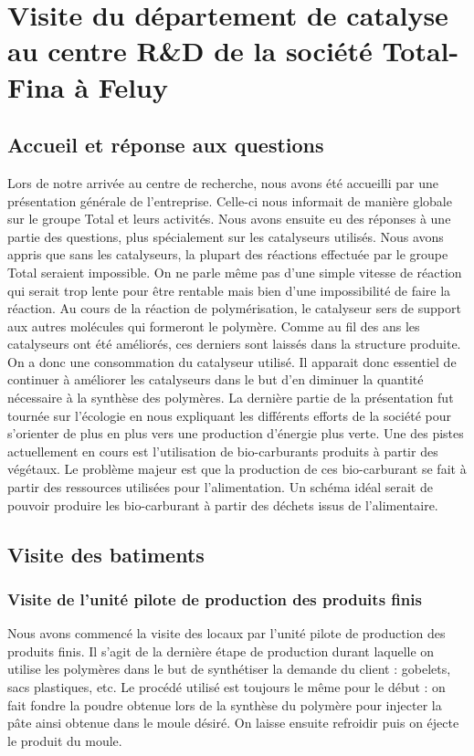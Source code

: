 \section{Visite du département de catalyse au centre R&D de la société Total-Fina à Feluy}
\subsection{Accueil et réponse aux questions}
Lors de notre arrivée au centre de recherche, nous avons été accueilli par une présentation générale de l'entreprise. Celle-ci nous informait de manière globale sur le groupe Total et leurs activités.
Nous avons ensuite eu des réponses à une partie des questions, plus spécialement sur les catalyseurs utilisés. Nous avons appris que sans les catalyseurs, la plupart des réactions effectuée par le groupe Total seraient impossible. On ne parle même pas d'une simple vitesse de réaction qui serait trop lente pour être rentable mais bien d'une impossibilité de faire la réaction. Au cours de la réaction de polymérisation, le catalyseur sers de support aux autres molécules qui formeront le polymère. Comme au fil des ans les catalyseurs ont été améliorés, ces derniers sont laissés dans la structure produite. On a donc une consommation du catalyseur utilisé. Il apparait donc essentiel de continuer à améliorer les catalyseurs dans le but d'en diminuer la quantité nécessaire à la synthèse des polymères.
La dernière partie de la présentation fut tournée sur l'écologie en nous expliquant les différents efforts de la société pour s'orienter de plus en plus vers une production d'énergie plus verte. Une des pistes actuellement en cours est l'utilisation de bio-carburants produits à partir des végétaux. Le problème majeur est que la production de ces bio-carburant se fait à partir des ressources utilisées pour l'alimentation. Un schéma idéal serait de pouvoir produire les bio-carburant à partir des déchets issus de l'alimentaire.
\subsection{Visite des batiments}
\subsubsection{Visite de l'unité pilote de production des produits finis}
Nous avons commencé la visite des locaux par l'unité pilote de production des produits finis. Il s'agit de la dernière étape de production durant laquelle on utilise les polymères dans le but de synthétiser la demande du client : gobelets, sacs plastiques, etc. Le procédé utilisé est toujours le même pour le début : on fait fondre la poudre obtenue lors de la synthèse du polymère pour injecter la pâte ainsi obtenue dans le moule désiré. On laisse ensuite refroidir puis on éjecte le produit du moule.
